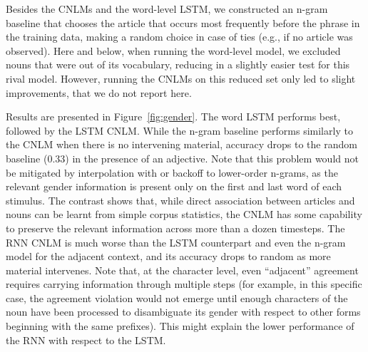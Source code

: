 Besides the CNLMs and the word-level LSTM, we constructed an n-gram baseline that chooses the article that occurs most frequently before the phrase in the training data, making a random choice in case of ties (e.g., if no article was observed). Here and below, when running the word-level model, we excluded nouns that were out of its vocabulary, reducing in a slightly easier test for this rival model. However, running the CNLMs on this reduced set only led to slight improvements, that we do not report here. 

Results are presented in Figure~\ref{fig:gender}. The word LSTM  performs best, followed by the LSTM CNLM.
While the n-gram baseline performs similarly to the CNLM when there is no intervening material, accuracy drops to the random baseline (0.33) in the presence of an adjective.
Note that this problem would not be mitigated by interpolation with or backoff to lower-order n-grams, as the relevant gender information is present only on the first and last word of each stimulus. The contrast shows that, while direct association between articles and nouns can be learnt from simple corpus statistics, the CNLM has some capability to preserve the relevant information across more than a dozen timesteps. The RNN CNLM is much worse than the LSTM counterpart and even the n-gram model for the adjacent context, and its accuracy drops to random as more material intervenes. Note that, at the character level, even ``adjacent'' agreement requires carrying information through multiple steps (for example, in this specific case, the agreement violation would not emerge until enough characters of the noun have been processed to disambiguate its gender with respect to other forms beginning with the same prefixes). This might explain the lower performance of the RNN with respect to the LSTM.


